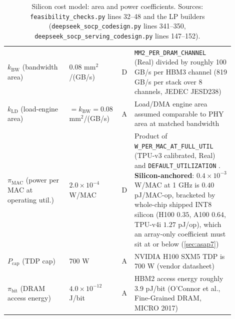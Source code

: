 \begin{table}[h]
\begin{tabular}{@{}p{0.26\linewidth}p{0.17\linewidth}p{0.045\linewidth}p{0.42\linewidth}@{}}
$k_{\mathrm{BW}}$ (bandwidth area) & 0.08 $\mathrm{mm}^2$/(GB/s) & D & \texttt{MM2\_PER\_DRAM\_CHANNEL} (Real) divided by roughly 100 GB/s per HBM3 channel (819 GB/s per stack over 8 channels, JEDEC JESD238) \\
$k_{\mathrm{LD}}$ (load-engine area) & $= k_{\mathrm{BW}} = 0.08$ $\mathrm{mm}^2$/(GB/s) & A & Load/DMA engine area assumed comparable to PHY area at matched bandwidth \\
$\pi_{\mathrm{MAC}}$ (power per MAC at operating util.) & $2.0\times10^{-4}$ W/MAC & D & Product of \texttt{W\_PER\_MAC\_AT\_FULL\_UTIL} (TPU-v3 calibrated, Real) and \texttt{DEFAULT\_UTILIZATION} \citep{jouppi2021ten}. \textbf{Silicon-anchored}: $0.4\times10^{-3}$ W/MAC at 1 GHz is $0.40$ pJ/MAC-op, bracketed by whole-chip shipped INT8 silicon (H100 $0.35$, A100 $0.64$, TPU-v4i $1.27$ pJ/op), which an array-only coefficient must sit at or below (\cref{sec:asap7}) \\
$P_{\mathrm{cap}}$ (TDP cap) & 700 W & A & NVIDIA H100 SXM5 TDP is 700 W (vendor datasheet) \\
$\pi_{\mathrm{bit}}$ (DRAM access energy) & $4.0\times10^{-12}$ J/bit & A & HBM2 access energy roughly 3.9 pJ/bit (O'Connor et al., Fine-Grained DRAM, MICRO 2017) \\
\bottomrule
\end{tabular}
\caption{Silicon cost model: area and power coefficients. Sources: \texttt{feasibility\_checks.py} lines 32--48 and the LP builders (\texttt{deepseek\_socp\_codesign.py} lines 341--350, \texttt{deepseek\_socp\_serving\_codesign.py} lines 147--152).}
\label{tab:coeff_cost_model}
\end{table}

